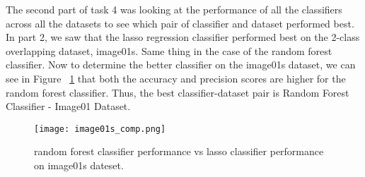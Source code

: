 \documentclass[sigconf]{acmart}
\begin{document}
The second part of task 4 was looking at the performance of all the classifiers across all the datasets to see which pair of classifier and dataset performed best. In part 2, we saw that the lasso regression classifier performed best on the 2-class overlapping dataset, image01s. Same thing in the case of the random forest classifier. Now to determine the better classifier on the image01s dataset, we can see in Figure ~\ref{fig:image01s_comp} that both the accuracy and precision scores are higher for the random forest classifier. Thus, the best classifier-dataset pair is Random Forest Classifier - Image01 Dataset.
\begin{figure}[h]
 \centering
    \texttt{[image: image01s\_comp.png]}
    \caption{random forest classifier performance vs lasso classifier performance on image01s dateset.}
     \label{fig:image01s_comp}
\end{figure}
\end{document}
